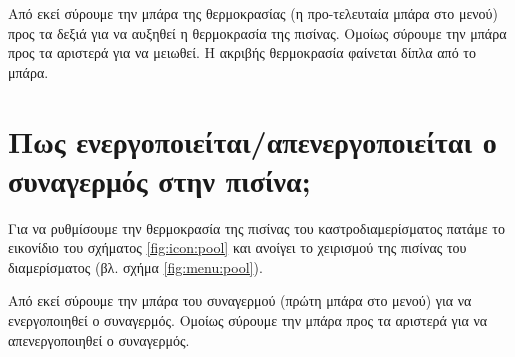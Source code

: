 \documentclass[a4paper,titlepage,twoside,12pt,leqno]{article}
\begin{document}
Από εκεί σύρουμε την μπάρα της θερμοκρασίας (η προ-τελευταία μπάρα στο μενού) προς τα δεξιά για να αυξηθεί η θερμοκρασία της πισίνας. Ομοίως σύρουμε την μπάρα προς τα αριστερά για να μειωθεί. Η ακριβής θερμοκρασία φαίνεται δίπλα από το μπάρα.  

\newpage
\section{Πως ενεργοποιείται/απενεργοποιείται ο συναγερμός στην πισίνα;}

Για να ρυθμίσουμε την θερμοκρασία της πισίνας του καστροδιαμερίσματος πατάμε το εικονίδιο του σχήματος \ref{fig:icon:pool} και ανοίγει το χειρισμού της πισίνας του διαμερίσματος (βλ. σχήμα \ref{fig:menu:pool}).

Από εκεί σύρουμε την μπάρα του συναγερμού (πρώτη μπάρα στο μενού) για να ενεργοποιηθεί ο συναγερμός. Ομοίως σύρουμε την μπάρα προς τα αριστερά για να απενεργοποιηθεί ο συναγερμός.
\end{document}
